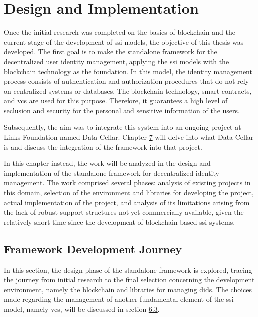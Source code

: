 \chapter{Design and Implementation} \label{ch:framework}

Once the initial research was completed on the basics of blockchain and the current stage of the development of \gls{ssi} models, the objective of this thesis was developed. The 
first goal is to make the standalone framework for the decentralized user identity management, applying the \gls{ssi} models with the blockchain technology as the foundation. In 
this model, the identity management process consists of authentication and authorization procedures that do not rely on centralized systems or databases. The blockchain 
technology, smart contracts, and \gls{vc}s are used for this purpose. Therefore, it guarantees a high level of seclusion and security for the personal and 
sensitive information of the users.

Subsequently, the aim was to integrate this system into an ongoing project at Links Foundation named Data Cellar. Chapter \hyperref[ch:integration]{7} will delve into what Data Cellar is and discuss 
the integration of the framework into that project. 

In this chapter instead, the work will be analyzed in the design and implementation of the standalone framework for decentralized identity management. The work comprised 
several phases: analysis of existing projects in this domain, selection of the environment and libraries for developing the project, actual implementation of the project, 
and analysis of its limitations arising from the lack of robust support structures not yet commercially available, given the relatively short time since the development of 
blockchain-based \gls{ssi} systems.

\section{Framework Development Journey}

In this section, the design phase of the standalone framework is explored, tracing the journey from initial research to the final selection concerning the development 
environment, namely the blockchain and libraries for managing \gls{did}s. The choices made regarding the management of another fundamental element of the \gls{ssi} model, namely \gls{vc}s, 
will be discussed in section \hyperref[sec:6.3]{6.3}.

